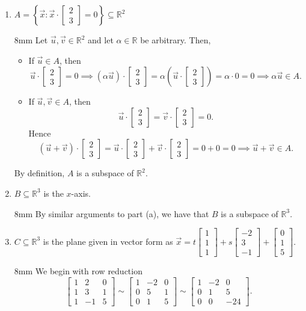 \documentclass[letter]{article}
\newcommand{\R}{\mathbb{R}}
\newcommand{\mat}[1]{\begin{bmatrix}#1\end{bmatrix}}
\newenvironment{answer}{
	\begin{adjustwidth}{8mm}{} \vspace{2mm}}{\end{adjustwidth} \vspace{2mm}
}
\theoremstyle{plain}
\theoremstyle{definition}
\theoremstyle{remark}
\begin{document}
\begin{enumerate}
		\begin{enumerate}
			\item ${A}=\left\{\vec x:\vec x\cdot \mat{2\\3}=0\right\}\subseteq \R^2$ 
			\begin{answer}
			Let $\vec{u}, \vec{v} \in \R^2$ and let $\alpha \in \R$ be arbitrary. Then,
				\begin{itemize}
					\item If $\vec{u} \in A$, then
					\[
					\vec{u} \cdot \mat{2\\3} = 0 \implies (\alpha \vec{u})\cdot \mat{2\\3} = \alpha\left(\vec{u}\cdot\mat{2\\3}\right) = \alpha\cdot 0 = 0 \implies \alpha \vec{u} \in A.
					\]
					\item If $\vec{u},\vec{v} \in A$, then
					\[
					\vec{u} \cdot \mat{2\\3} = \vec{v} \cdot \mat{2\\3} = 0.
					\]
					Hence
					\[
					(\vec{u} + \vec{v}) \cdot \mat{2\\3} = \vec{u}\cdot \mat{2\\3} + \vec{v} \cdot \mat{2\\3} = 0+0 = 0 \implies \vec{u} + \vec{v} \in A. 
					\]
				\end{itemize}
				By definition, $A$ is a subspace of $\R^2$. 
			\end{answer}
			\item ${B}\subseteq \R^3$ is the $x$-axis.
			\begin{answer}
				By similar arguments to part (a), we have that $B$ is a subspace of $\R^3$. 
			\end{answer}
			\item ${C}\subseteq \R^3$ is the plane given in vector form as $\vec x=t\mat{1\\1\\1}+s\mat{-2\\3\\-1}+\mat{0\\1\\5}$.
			\begin{answer}
				We begin with row reduction
				\[
				\mat{1&2&0\\1&3&1\\1&-1&5} \sim \mat{1&-2&0\\0&5&1\\0&1&5} \sim \mat{1&-2&0\\0&1&5\\0&0&-24}.
\]
\end{answer}
\end{enumerate}
\end{enumerate}
\end{document}

